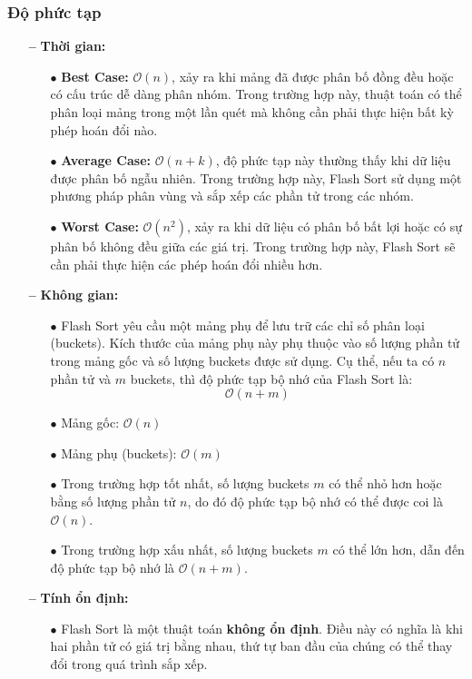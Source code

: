 \subsubsection{Độ phức tạp}
\begin{itemize}
    \item[\textbf{--}] \textbf{Thời gian:}
    \begin{itemize}
        \item[$\bullet$] \textbf{Best Case:} \(\mathcal{O}(n)\), xảy ra khi mảng đã được phân bố đồng đều hoặc có cấu trúc dễ dàng phân nhóm. Trong trường hợp này, thuật toán có thể phân loại mảng trong một lần quét mà không cần phải thực hiện bất kỳ phép hoán đổi nào.
        \item[$\bullet$] \textbf{Average Case:} \(\mathcal{O}(n + k)\), độ phức tạp này thường thấy khi dữ liệu được phân bố ngẫu nhiên. Trong trường hợp này, Flash Sort sử dụng một phương pháp phân vùng và sắp xếp các phần tử trong các nhóm.
        \item[$\bullet$] \textbf{Worst Case:} \(\mathcal{O}(n^2)\), xảy ra khi dữ liệu có phân bố bất lợi hoặc có sự phân bố không đều giữa các giá trị. Trong trường hợp này, Flash Sort sẽ cần phải thực hiện các phép hoán đổi nhiều hơn.
    \end{itemize}
    \item[\textbf{--}] \textbf{Không gian:}
    \begin{itemize}
        \item[$\bullet$] Flash Sort yêu cầu một mảng phụ để lưu trữ các chỉ số phân loại (buckets). Kích thước của mảng phụ này phụ thuộc vào số lượng phần tử trong mảng gốc và số lượng buckets được sử dụng. Cụ thể, nếu ta có \(n\) phần tử và \(m\) buckets, thì độ phức tạp bộ nhớ của Flash Sort là:
        \[
        \mathcal{O}(n + m)
        \]
        \item[$\bullet$] Mảng gốc: \(\mathcal{O}(n)\)
        \item[$\bullet$] Mảng phụ (buckets): \(\mathcal{O}(m)\)
        \item[$\bullet$] Trong trường hợp tốt nhất, số lượng buckets \(m\) có thể nhỏ hơn hoặc bằng số lượng phần tử \(n\), do đó độ phức tạp bộ nhớ có thể được coi là \(\mathcal{O}(n)\).
        \item[$\bullet$] Trong trường hợp xấu nhất, số lượng buckets \(m\) có thể lớn hơn, dẫn đến độ phức tạp bộ nhớ là \(\mathcal{O}(n + m)\).
    \end{itemize}
    \item[\textbf{--}] \textbf{Tính ổn định:}
    \begin{itemize}
        \item[$\bullet$] Flash Sort là một thuật toán \textbf{không ổn định}. Điều này có nghĩa là khi hai phần tử có giá trị bằng nhau, thứ tự ban đầu của chúng có thể thay đổi trong quá trình sắp xếp.
    \end{itemize}
\end{itemize}
